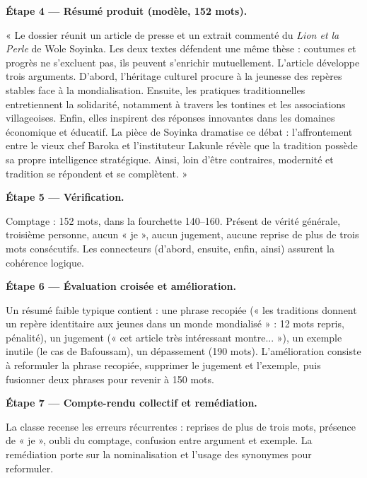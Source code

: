 \documentclass[11pt]{article}
\newcounter{popsec}
\newcounter{popsub}
\newcommand{\courssub}[1]{%
  \stepcounter{popsub}%
  \par\vspace{9pt}\noindent{\popxbold\fontsize{11.5}{13}\selectfont\color{popink}{\color{poporange}\thepopsec.\thepopsub}\hspace{6pt}#1}\par\nopagebreak\vspace{4pt}
}
\begin{document}
\begin{exoresolu}
\textbf{Étape 4 — Résumé produit (modèle, 152 mots).}

« Le dossier réunit un article de presse et un extrait commenté du \emph{Lion et la Perle} de Wole Soyinka. Les deux textes défendent une même thèse : coutumes et progrès ne s'excluent pas, ils peuvent s'enrichir mutuellement. L'article développe trois arguments. D'abord, l'héritage culturel procure à la jeunesse des repères stables face à la mondialisation. Ensuite, les pratiques traditionnelles entretiennent la solidarité, notamment à travers les tontines et les associations villageoises. Enfin, elles inspirent des réponses innovantes dans les domaines économique et éducatif. La pièce de Soyinka dramatise ce débat : l'affrontement entre le vieux chef Baroka et l'instituteur Lakunle révèle que la tradition possède sa propre intelligence stratégique. Ainsi, loin d'être contraires, modernité et tradition se répondent et se complètent. »

\textbf{Étape 5 — Vérification.}

Comptage : 152 mots, dans la fourchette 140–160. Présent de vérité générale, troisième personne, aucun « je », aucun jugement, aucune reprise de plus de trois mots consécutifs. Les connecteurs (d'abord, ensuite, enfin, ainsi) assurent la cohérence logique.

\textbf{Étape 6 — Évaluation croisée et amélioration.}

Un résumé faible typique contient : une phrase recopiée (« les traditions donnent un repère identitaire aux jeunes dans un monde mondialisé » : 12 mots repris, pénalité), un jugement (« cet article très intéressant montre... »), un exemple inutile (le cas de Bafoussam), un dépassement (190 mots). L'amélioration consiste à reformuler la phrase recopiée, supprimer le jugement et l'exemple, puis fusionner deux phrases pour revenir à 150 mots.

\textbf{Étape 7 — Compte-rendu collectif et remédiation.}

La classe recense les erreurs récurrentes : reprises de plus de trois mots, présence de « je », oubli du comptage, confusion entre argument et exemple. La remédiation porte sur la nominalisation et l'usage des synonymes pour reformuler.
\end{exoresolu}

\courssub{Bilan de l'activité}
\end{document}
